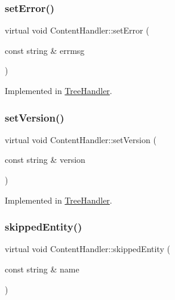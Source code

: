 \subsubsection{\texorpdfstring{setError()}{setError()}}
{\footnotesize\ttfamily virtual void Content\+Handler\+::set\+Error (\begin{DoxyParamCaption}\item[{const string \&}]{errmsg }\end{DoxyParamCaption})\hspace{0.3cm}{\ttfamily [pure virtual]}}



Implemented in \mbox{\hyperlink{class_tree_handler_a2e7990443435013045fc5fc5ae363492}{Tree\+Handler}}.

\mbox{\label{class_content_handler_a4b01bbac0e89948eb931c30f826db443}} 
\subsubsection{\texorpdfstring{setVersion()}{setVersion()}}
{\footnotesize\ttfamily virtual void Content\+Handler\+::set\+Version (\begin{DoxyParamCaption}\item[{const string \&}]{version }\end{DoxyParamCaption})\hspace{0.3cm}{\ttfamily [pure virtual]}}



Implemented in \mbox{\hyperlink{class_tree_handler_ab16dcd42f1f701b5f892f2d68ff6d4df}{Tree\+Handler}}.

\mbox{\label{class_content_handler_a5d5a40349d86c051c980c1e81cf7ab4c}} 
\subsubsection{\texorpdfstring{skippedEntity()}{skippedEntity()}}
{\footnotesize\ttfamily virtual void Content\+Handler\+::skipped\+Entity (\begin{DoxyParamCaption}\item[{const string \&}]{name }\end{DoxyParamCaption})\hspace{0.3cm}{\ttfamily [pure virtual]}}



